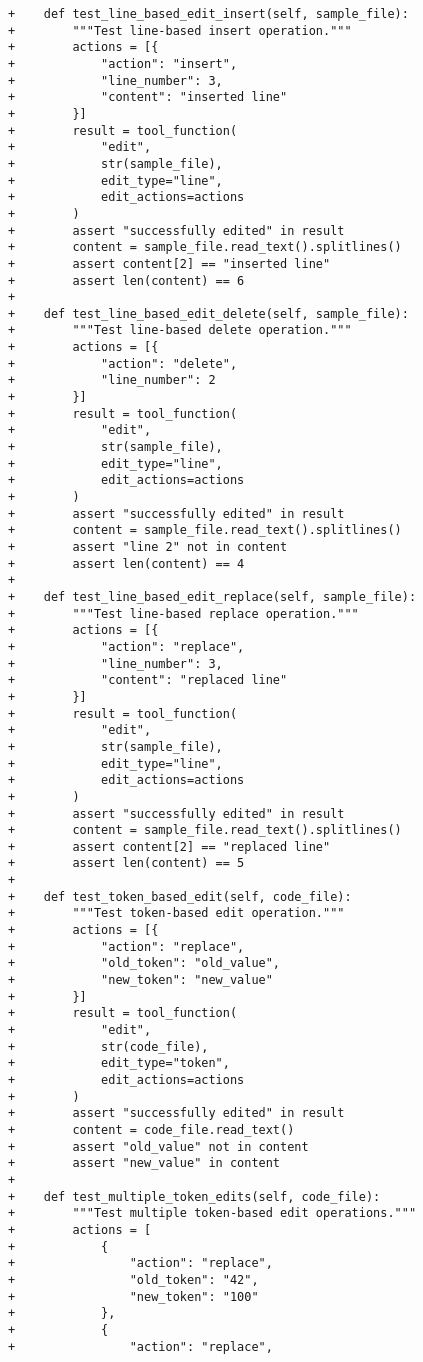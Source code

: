 \begin{lstlisting}[style=diffstyle]
+    def test_line_based_edit_insert(self, sample_file):
+        """Test line-based insert operation."""
+        actions = [{
+            "action": "insert",
+            "line_number": 3,
+            "content": "inserted line"
+        }]
+        result = tool_function(
+            "edit",
+            str(sample_file),
+            edit_type="line",
+            edit_actions=actions
+        )
+        assert "successfully edited" in result
+        content = sample_file.read_text().splitlines()
+        assert content[2] == "inserted line"
+        assert len(content) == 6
+
+    def test_line_based_edit_delete(self, sample_file):
+        """Test line-based delete operation."""
+        actions = [{
+            "action": "delete",
+            "line_number": 2
+        }]
+        result = tool_function(
+            "edit",
+            str(sample_file),
+            edit_type="line",
+            edit_actions=actions
+        )
+        assert "successfully edited" in result
+        content = sample_file.read_text().splitlines()
+        assert "line 2" not in content
+        assert len(content) == 4
+
+    def test_line_based_edit_replace(self, sample_file):
+        """Test line-based replace operation."""
+        actions = [{
+            "action": "replace",
+            "line_number": 3,
+            "content": "replaced line"
+        }]
+        result = tool_function(
+            "edit",
+            str(sample_file),
+            edit_type="line",
+            edit_actions=actions
+        )
+        assert "successfully edited" in result
+        content = sample_file.read_text().splitlines()
+        assert content[2] == "replaced line"
+        assert len(content) == 5
+
+    def test_token_based_edit(self, code_file):
+        """Test token-based edit operation."""
+        actions = [{
+            "action": "replace",
+            "old_token": "old_value",
+            "new_token": "new_value"
+        }]
+        result = tool_function(
+            "edit",
+            str(code_file),
+            edit_type="token",
+            edit_actions=actions
+        )
+        assert "successfully edited" in result
+        content = code_file.read_text()
+        assert "old_value" not in content
+        assert "new_value" in content
+
+    def test_multiple_token_edits(self, code_file):
+        """Test multiple token-based edit operations."""
+        actions = [
+            {
+                "action": "replace",
+                "old_token": "42",
+                "new_token": "100"
+            },
+            {
+                "action": "replace",

\end{lstlisting}
